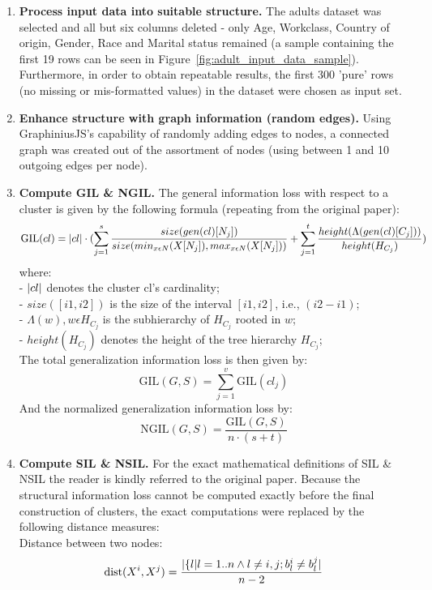 	\begin{enumerate}
		\item \textbf{Process input data into suitable structure.} The adults dataset was selected and all but six columns deleted - only Age, Workclass, Country of origin, Gender, Race and Marital status remained (a sample containing the first 19 rows can be seen in Figure~\ref{fig:adult_input_data_sample}). Furthermore, in order to obtain repeatable results, the first 300 'pure' rows (no missing or mis-formatted values) in the dataset were chosen as input set.
		
		\item \textbf{Enhance structure with graph information (random edges).} Using GraphiniusJS's capability of randomly adding edges to nodes, a connected graph was created out of the assortment of nodes (using between 1 and 10 outgoing edges per node).
		
		\item \textbf{Compute GIL \& NGIL.} The general information loss with respect to a cluster is given by the following formula (repeating from the original paper):
		\begin{equation*}
		\text{GIL}(cl) = \lvert cl\rvert \cdot (\sum_{j=1}^{s} \frac{size(gen(cl)[N_j])}{size(min_{x \epsilon N} (X[N_j]), max_{x \epsilon N} (X[N_j]))} + \sum_{j=1}^{t} \frac{height(\Lambda(gen(cl)[C_j]))}{height(H_{C_j})})
		\end{equation*}
		where:\\
		- $\lvert cl\rvert$ denotes the cluster cl's cardinality; \\
		- $size([i1,i2])$ is the size of the interval $[i1,i2]$, i.e., $(i2-i1)$; \\
		- $\Lambda(w), w \epsilon H_{C_j}$ is the subhierarchy of $H_{C_j}$ rooted in $w$; \\
		- $height(H_{C_j})$ denotes the height of the tree hierarchy $H_{C_j}$; \\
		
		The total generalization information loss is then given by:
		\begin{equation*}
			\text{GIL}(G,S) = \sum_{j=1}^{v} \text{GIL}(cl_j)
		\end{equation*}
		And the normalized generalization information loss by:
		\begin{equation*}
		\text{NGIL}(G,S) = \frac{\text{GIL}(G,S)}{n \cdot (s+t)}
		\end{equation*}
		
		\item \textbf{Compute SIL \& NSIL.} For the exact mathematical definitions of SIL \& NSIL the reader is kindly referred to the original paper. Because the structural information loss cannot be computed exactly before the final construction of clusters, the exact computations were replaced by the following distance measures: \\
		Distance between two nodes:
		\begin{equation*}
		\text{dist}(X^i, X^j) = \frac{\lvert\{l|l=1..n \wedge l \ne i,j;b_l^i \ne b_l^j\rvert}{n-2}
		\end{equation*}
		

\end{enumerate}
